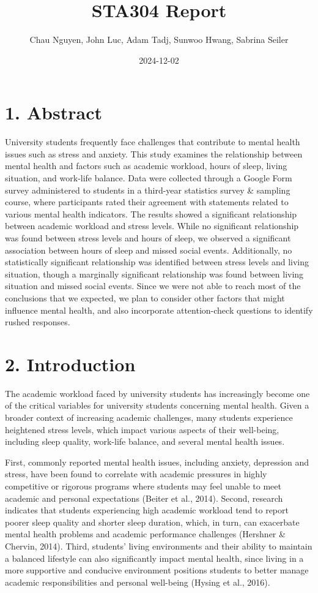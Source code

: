 \documentclass[
  letterpaper,
  DIV=11,
  numbers=noendperiod]{scrartcl}
\title{STA304 Report}
\author{Chau Nguyen, John Luc, Adam Tadj, Sunwoo Hwang, Sabrina Seiler}
\date{2024-12-02}
\begin{document}
\maketitle


\section{1. Abstract}\label{abstract}

University students frequently face challenges that contribute to mental
health issues such as stress and anxiety. This study examines the
relationship between mental health and factors such as academic
workload, hours of sleep, living situation, and work-life balance. Data
were collected through a Google Form survey administered to students in
a third-year statistics survey \& sampling course, where participants
rated their agreement with statements related to various mental health
indicators. The results showed a significant relationship between
academic workload and stress levels. While no significant relationship
was found between stress levels and hours of sleep, we observed a
significant association between hours of sleep and missed social events.
Additionally, no statistically significant relationship was identified
between stress levels and living situation, though a marginally
significant relationship was found between living situation and missed
social events. Since we were not able to reach most of the conclusions
that we expected, we plan to consider other factors that might influence
mental health, and also incorporate attention-check questions to
identify rushed responses.

\section{2. Introduction}\label{introduction}

The academic workload faced by university students has increasingly
become one of the critical variables for university students concerning
mental health. Given a broader context of increasing academic
challenges, many students experience heightened stress levels, which
impact various aspects of their well-being, including sleep quality,
work-life balance, and several mental health issues.

First, commonly reported mental health issues, including anxiety,
depression and stress, have been found to correlate with academic
pressures in highly competitive or rigorous programs where students may
feel unable to meet academic and personal expectations (Beiter et al.,
2014). Second, research indicates that students experiencing high
academic workload tend to report poorer sleep quality and shorter sleep
duration, which, in turn, can exacerbate mental health problems and
academic performance challenges (Hershner \& Chervin, 2014). Third,
students' living environments and their ability to maintain a balanced
lifestyle can also significantly impact mental health, since living in a
more supportive and conducive environment positions students to better
manage academic responsibilities and personal well-being (Hysing et al.,
2016).
\end{document}
